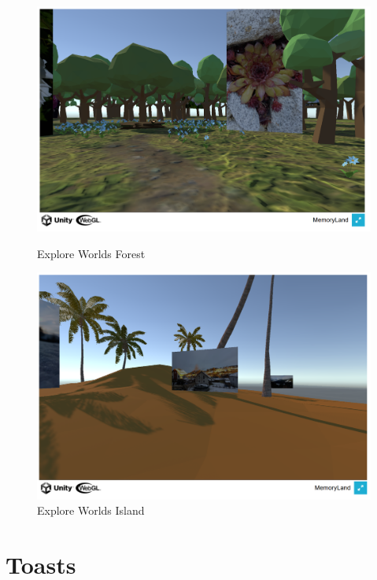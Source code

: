 \begin{figure} [h t]
    \centering
    \includegraphics[scale=0.5]{pics/explore_worlds_forest.PNG}
    \caption{Explore Worlds Forest}
    \label{fig:explore-worlds-forest}

    
    \centering
    \includegraphics[scale=0.5]{pics/explore_worlds_island.PNG}
    \caption{Explore Worlds Island}
    \label{fig:explore-worlds-island}
\end{figure}
















\section{Toasts}

